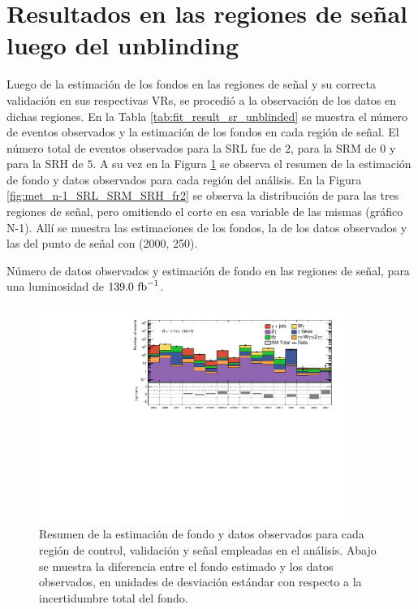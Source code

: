 


\section{Resultados en las regiones de señal luego del unblinding}

Luego de la estimación de los fondos en las regiones de señal y su correcta validación en sus respectivas VRs, se procedió a la observación de los datos en dichas regiones. En la Tabla \ref{tab:fit_result_sr_unblinded} se muestra el número de eventos observados y la estimación de los fondos en cada región de señal. El número total de eventos observados para la SRL fue de $2$, para la SRM de $0$ y para la SRH de $5$. A su vez en la Figura \ref{fig:regions_pulls_unblinded} se observa el resumen de la estimación de fondo y datos observados para cada región del análisis. En la Figura \ref{fig:met_n-1_SRL_SRM_SRH_fr2} se observa la distribución de \met para las tres regiones de señal, pero omitiendo el corte en esa variable de las mismas (gráfico N-1). Allí se muestra las estimaciones de los fondos, la de los datos observados y las del punto de señal con (2000, 250).


\begin{table}[ht!]
  \centering
  \caption{Número de datos observados y estimación de fondo en las regiones de señal, para una luminosidad de $139.0\ \text{fb}^{-1}$.}
  
  \label{tab:fit_result_sr_unblinded}
\end{table}

\begin{figure}[ht!]
  \centering
  \includegraphics[width=0.89\textwidth]{images_tmp/results/fr2_unblind/regions_pull_significance.pdf}
  \caption{Resumen de la estimación de fondo y datos observados para cada región de control, validación y señal empleadas en el análisis. Abajo se muestra la diferencia entre el fondo estimado y los datos observados, en unidades de desviación estándar con respecto a la incertidumbre total del fondo.}
  \label{fig:regions_pulls_unblinded}
\end{figure}


